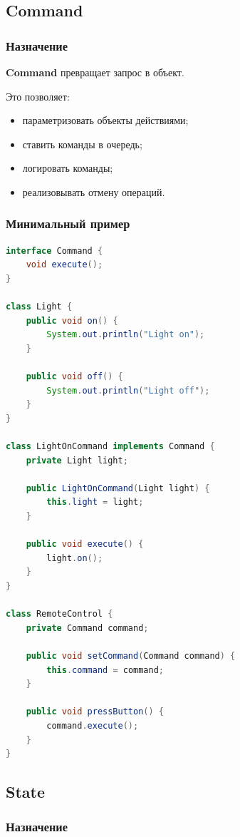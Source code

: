 \documentclass[12pt,a4paper]{article}
\begin{document}
\subsection{Command}

\subsubsection{Назначение}

\textbf{Command} превращает запрос в объект.

Это позволяет:
\begin{itemize}
    \item параметризовать объекты действиями;
    \item ставить команды в очередь;
    \item логировать команды;
    \item реализовывать отмену операций.
\end{itemize}

\subsubsection{Минимальный пример}

\begin{lstlisting}[language=Java,caption={Command}]
interface Command {
    void execute();
}

class Light {
    public void on() {
        System.out.println("Light on");
    }

    public void off() {
        System.out.println("Light off");
    }
}

class LightOnCommand implements Command {
    private Light light;

    public LightOnCommand(Light light) {
        this.light = light;
    }

    public void execute() {
        light.on();
    }
}

class RemoteControl {
    private Command command;

    public void setCommand(Command command) {
        this.command = command;
    }

    public void pressButton() {
        command.execute();
    }
}
\end{lstlisting}

\subsection{State}

\subsubsection{Назначение}
\end{document}
